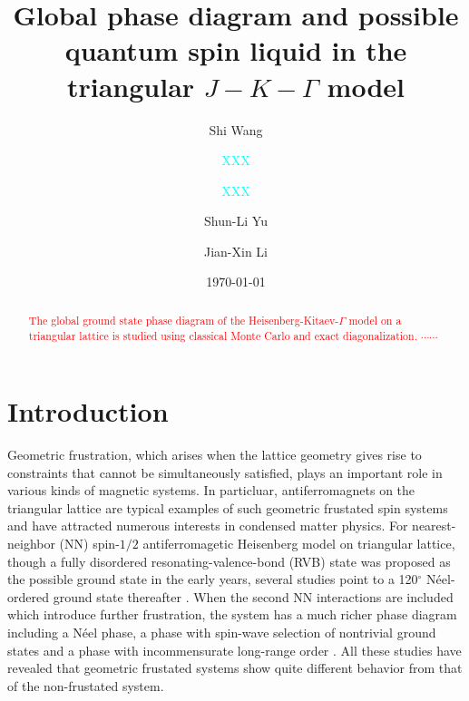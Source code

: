 \documentclass[aps,prb,reprint,groupedaddress,showpacs,amsfonts,amsmath,amssymb,superscriptaddress]{revtex4-1}
\begin{document}
\title{Global phase diagram and possible quantum spin liquid in the triangular $J-K-\Gamma$ model}

\author{Shi Wang}

\author{\textcolor{cyan}{XXX}}
\affiliation{\textcolor{cyan}{XXX}}
\author{\textcolor{cyan}{XXX}}
\affiliation{\textcolor{cyan}{XXX}}

\author{Shun-Li Yu}
\author{Jian-Xin Li}

\date{\today}

\begin{abstract}
\textcolor{red}{The global ground state phase diagram of the Heisenberg-Kitaev-$\Gamma$ model on a triangular lattice is studied using classical Monte Carlo and exact diagonalization. $\cdots \cdots$}
\end{abstract}

\maketitle

\section{Introduction}
Geometric frustration, which arises when the lattice geometry gives rise to constraints that cannot be simultaneously satisfied, plays an important role in various kinds of magnetic systems. In particluar, antiferromagnets on the triangular lattice are typical examples of such geometric frustated spin systems and have attracted numerous interests in condensed matter physics. For nearest-neighbor (NN) spin-$1/2$ antiferromagetic Heisenberg model on triangular lattice, though a fully disordered resonating-valence-bond (RVB) \cite{Anderson1973} state was proposed as the possible ground state in the early years, several studies point to a 120$^\circ$ N\'{e}el-ordered ground state thereafter \cite{PhysRevLett.99.127004,PhysRevLett.82.3899,PhysRevB.50.10048,PhysRevLett.60.2531}. When the second NN interactions are included which introduce further frustration, the system has a much richer phase diagram including a N\'{e}el phase, a phase with spin-wave selection of nontrivial ground states and a phase with incommensurate long-range order \cite{PhysRevB.42.4800,PhysRevB.46.11137}. All these studies have revealed that geometric frustated systems show quite different behavior from that of the non-frustated system.
\end{document}
